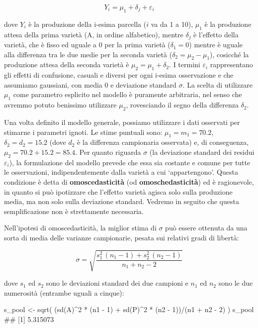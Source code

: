 \documentclass[a4paper,12pt,oneside]{book}
\newenvironment{Shaded}{\begin{snugshade}}{\end{snugshade}}
\newcommand{\DecValTok}[1]{#1}
\newcommand{\SpecialCharTok}[1]{#1}
\newcommand{\DocumentationTok}[1]{#1}
\newcommand{\OtherTok}[1]{#1}
\newcommand{\FunctionTok}[1]{#1}
\newcommand{\NormalTok}[1]{#1}
\begin{document}
\[
Y_i = \mu_1 + \delta_j + \varepsilon_{i} 
\]

dove \(Y_i\) è la produzione della i-esima parcella (\(i\) va da 1 a 10), \(\mu_1\) è la produzione attesa della prima varietà (A, in ordine alfabetico), mentre \(\delta_j\) è l'effetto della varietà, che è fisso ed uguale a 0 per la prima varietà (\(\delta_1 = 0\)) mentre è uguale alla differenza tra le due medie per la seconda varietà (\(\delta_2 = \mu_2 - \mu_1\)), cosicché la produzione attesa della seconda varietà è \(\mu_2 = \mu_1 + \delta_2\). I termini \(\varepsilon_i\) rappresentano gli effetti di confusione, casuali e diversi per ogni i-esima osservazione e che assumiamo gaussiani, con media 0 e deviazione standard \(\sigma\). La scelta di utilizzare \(\mu_1\) come parametro esplicito nel modello è puramente arbitraria, nel senso che avremmo potuto benissimo utilizzare \(\mu_2\), rovesciando il segno della differenza \(\delta_2\).

Una volta definito il modello generale, possiamo utilizzare i dati osservati per stimarne i parametri ignoti. Le stime puntuali sono: \(\mu_1 = m_1 = 70.2\), \(\delta_2 = d_2 = 15.2\) (dove \(d_2\) è la differenza campionaria osservata) e, di conseguenza, \(\mu_2 = 70.2 + 15.2 = 85.4\). Per quanto riguarda \(\sigma\) (la deviazione standard dei residui \(\varepsilon_i\)), la formulazione del modello prevede che essa sia costante e comune per tutte le osservazioni, indipendentemente dalla varietà a cui `appartengono'. Questa condizione è detta di \textbf{omoscedasticità} (od \textbf{omoschedasticità}) ed è ragionevole, in quanto si può ipotizzare che l'effetto varietà agisca solo sulla produzione media, ma non solo sulla deviazione standard. Vedremo in seguito che questa semplificazione non è strettamente necessaria.

Nell'ipotesi di omoscedasticità, la miglior stima di \(\sigma\) può essere ottenuta da una sorta di media delle varianze campionarie, pesata sui relativi gradi di libertà:

\[\sigma = \sqrt{ \frac{s_1^2 \, (n_1 - 1) + s_2^2 \, (n_2 - 1)}{n_1 + n_2 - 2} }\]

dove \(s_1\) ed \(s_2\) sono le deviazioni standard dei due campioni e \(n_1\) ed \(n_2\) sono le due numerosità (entrambe uguali a cinque):

\begin{Shaded}
\begin{Highlighting}[]
\NormalTok{s\_pool }\OtherTok{\textless{}{-}} \FunctionTok{sqrt}\NormalTok{( (}\FunctionTok{sd}\NormalTok{(A)}\SpecialCharTok{\^{}}\DecValTok{2} \SpecialCharTok{*}\NormalTok{ (n1 }\SpecialCharTok{{-}} \DecValTok{1}\NormalTok{) }\SpecialCharTok{+} \FunctionTok{sd}\NormalTok{(P)}\SpecialCharTok{\^{}}\DecValTok{2} \SpecialCharTok{*}\NormalTok{ (n2 }\SpecialCharTok{{-}} \DecValTok{1}\NormalTok{))}\SpecialCharTok{/}\NormalTok{(n1 }\SpecialCharTok{+}\NormalTok{ n2 }\SpecialCharTok{{-}} \DecValTok{2}\NormalTok{) )}
\NormalTok{s\_pool}
\DocumentationTok{\#\# [1] 5.315073}
\end{Highlighting}
\end{Shaded}
\end{document}
